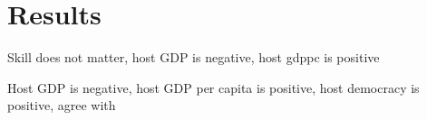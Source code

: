 \section{Results}

Skill does not matter, host GDP is negative, host gdppc is positive \citep{Eicher2012}

Host GDP is negative, host GDP per capita is positive, host democracy is positive, agree with 
